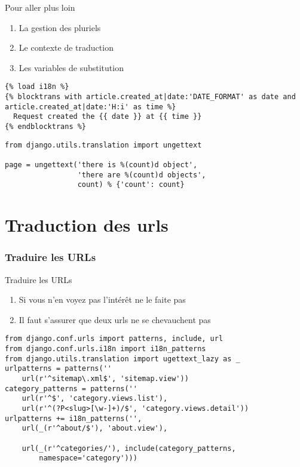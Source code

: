 \documentclass{beamer}
\begin{document}
\begin{frame}[fragile]
  \begin{alertblock}{Pour aller plus loin}
    \begin{enumerate}
      \pause \item La gestion des pluriels
      \pause \item Le contexte de traduction
      \pause \item Les variables de substitution
    \end{enumerate}
  \end{alertblock}
  \pause

  \begin{lstlisting}
{% load i18n %}
{% blocktrans with article.created_at|date:'DATE_FORMAT' as date and article.created_at|date:'H:i' as time %}
  Request created the {{ date }} at {{ time }}
{% endblocktrans %}
  \end{lstlisting}
\pause

  \begin{lstlisting}
from django.utils.translation import ungettext

page = ungettext('there is %(count)d object',
                 'there are %(count)d objects',
                 count) % {'count': count}
  \end{lstlisting}

\end{frame}

\section{Traduction des urls}

\begin{frame}[fragile]
  \frametitle{Traduire les URLs}

  \begin{alertblock}{Traduire les URLs}
      \begin{enumerate}
         \pause \item Si vous n'en voyez pas l'intérêt ne le faite pas
         \pause \item Il faut s'assurer que deux urls ne se chevauchent pas
      \end{enumerate}
  \end{alertblock}
\pause

  \begin{lstlisting}
from django.conf.urls import patterns, include, url
from django.conf.urls.i18n import i18n_patterns
from django.utils.translation import ugettext_lazy as _
urlpatterns = patterns(''
    url(r'^sitemap\.xml$', 'sitemap.view'))
category_patterns = patterns(''
    url(r'^$', 'category.views.list'),
    url(r'^(?P<slug>[\w-]+)/$', 'category.views.detail'))
urlpatterns += i18n_patterns('',
    url(_(r'^about/$'), 'about.view'),

    url(_(r'^categories/'), include(category_patterns,
        namespace='category')))
  \end{lstlisting}

\end{frame}
\end{document}
